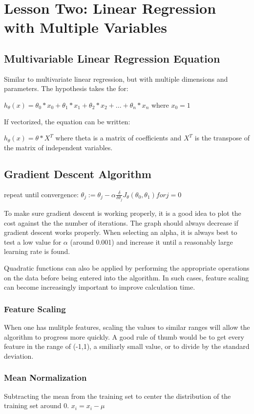 \documentclass[12pt, twoside, a4paper]{book}
\begin{document}
\chapter{Lesson Two: Linear Regression with Multiple Variables}
\section{Multivariable Linear Regression Equation}
Similar to multivariate linear regression, but with multiple dimensions and parameters. The hypothesis takes the for:

$h_\theta(x)=\theta_0 * x_0 + \theta_1 * x_1 + \theta_2 * x_2 + ... + \theta_n * x_n$
where $x_0 = 1$

If vectorized, the equation can be written:

$h_\theta(x)=\theta * X^T$ where theta is a matrix of coefficients and $X^T$ is the transpose of the matrix of independent variables.

\section{Gradient Descent Algorithm}
repeat until convergence: $\theta_j := \theta_j - \alpha\frac{\delta}{\delta\theta_j}J_\theta(\theta_0,\theta_1) for j=0$

To make sure gradient descent is working properly, it is a good idea to plot the cost against the the number of iterations. The graph should always decrease if gradient descent works properly. When selecting an alpha, it is always best to test a low value for $\alpha$ (around 0.001) and increase it until a reasonably large learning rate is found.

Quadratic functions can also be applied by performing the appropriate operations on the data before being entered into the algorithm. In such cases, feature scaling can become increasingly important to improve calculation time.

\subsection{Feature Scaling}
When one has mulitple features, scaling the values to similar ranges will allow the algorithm to progress more quickly. A good rule of thumb would be to get every feature in the range of (-1,1), a smiliarly small value, or to divide by the standard deviation.
\subsection{Mean Normalization}
Subtracting the mean from the training set to center the distribution of the training set around 0. $x_i = x_i - \mu$
\end{document}
